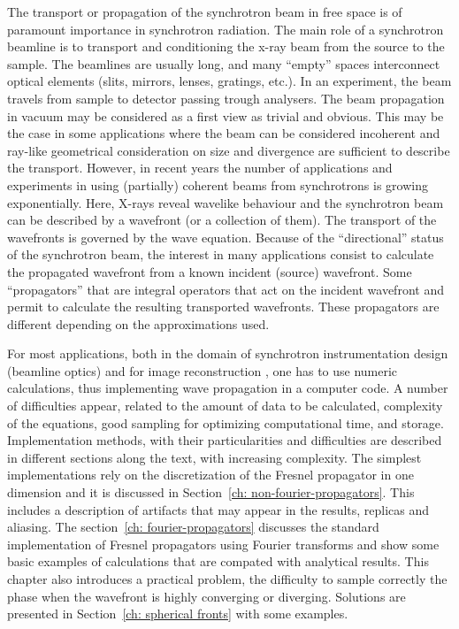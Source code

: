 \documentclass{iucr}              %
\begin{document}
The transport or propagation of the synchrotron beam in free space is of paramount importance in synchrotron radiation. 
The main role of a synchrotron beamline is to transport and conditioning the x-ray beam from the source to the sample. The beamlines are usually long, and many ``empty'' spaces interconnect optical elements (slits, mirrors, lenses, gratings, etc.). In an experiment, the beam travels from sample to detector passing trough analysers. The beam propagation in vacuum may be considered as a first view as trivial and obvious. This may be the case in some applications where the beam can be considered incoherent and ray-like geometrical consideration on size and divergence are sufficient to describe the transport. 
However, in recent years the number of applications and experiments in using (partially) coherent beams from synchrotrons is growing exponentially. Here, X-rays reveal wavelike behaviour and the synchrotron beam can be described by a wavefront (or a collection of them). The transport of the wavefronts is governed by the wave equation. Because of the ``directional'' status of the synchrotron beam, the interest in many applications consist to calculate the propagated wavefront from a known incident (source) wavefront. Some ``propagators'' that are integral operators that act on the incident wavefront and permit to calculate the resulting transported wavefronts. These propagators are different depending on the approximations used. 

For most applications, both in the domain of synchrotron instrumentation design (beamline optics) and for image reconstruction \cite{maiden_josaa_2012,gilles_optica_2018}, one has to use numeric calculations, thus implementing wave propagation in a computer code. A number of difficulties appear, related to the amount of data to be calculated, complexity of the equations, good sampling for optimizing computational time, and storage. Implementation methods, with their particularities and difficulties are described in different sections along the text, with increasing complexity. The simplest implementations rely on the discretization of the Fresnel propagator in one dimension and it is discussed in Section~\ref{ch: non-fourier-propagators}. This includes a description of artifacts that may appear in the results, replicas and aliasing. The section~\ref{ch: fourier-propagators} discusses the standard implementation of Fresnel propagators using Fourier transforms and show some basic examples of calculations that are compated with analytical results. This chapter also introduces a practical problem, the difficulty to sample correctly the phase when the wavefront is highly converging or diverging. Solutions are presented in Section~\ref{ch: spherical fronts} with some examples. 
\end{document}

